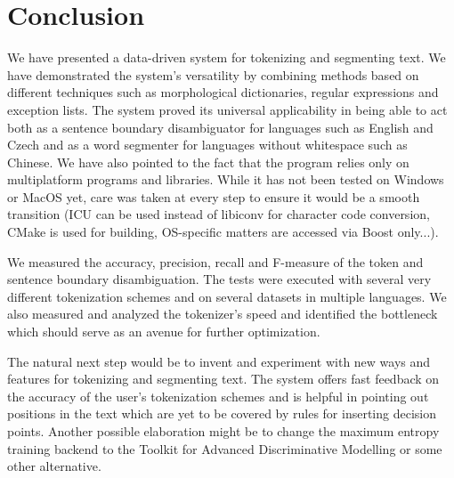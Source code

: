 \chapter*{Conclusion}

We have presented a data-driven system for tokenizing and segmenting text. We
have demonstrated the system's versatility by combining methods based on
different techniques such as morphological dictionaries, regular expressions
and exception lists. The system proved its universal applicability in being
able to act both as a sentence boundary disambiguator for languages such as
English and Czech and as a word segmenter for languages without whitespace such
as Chinese. We have also pointed to the fact that the program relies only on
multiplatform programs and libraries. While it has not been tested on Windows
or MacOS yet, care was taken at every step to ensure it would be a smooth
transition (ICU can be used instead of libiconv for character code conversion,
CMake is used for building, OS-specific matters are accessed via Boost
only...).

We measured the accuracy, precision, recall and F-measure of the token and
sentence boundary disambiguation. The tests were executed with several very
different tokenization schemes and on several datasets in multiple languages.
We also measured and analyzed the tokenizer's speed and identified the
bottleneck which should serve as an avenue for further optimization.

The natural next step would be to invent and experiment with new ways and
features for tokenizing and segmenting text. The system offers fast feedback on
the accuracy of the user's tokenization schemes and is helpful in pointing out
positions in the text which are yet to be covered by rules for inserting
decision points. Another possible elaboration might be to change the maximum
entropy training backend to the Toolkit for Advanced Discriminative Modelling
or some other alternative.
